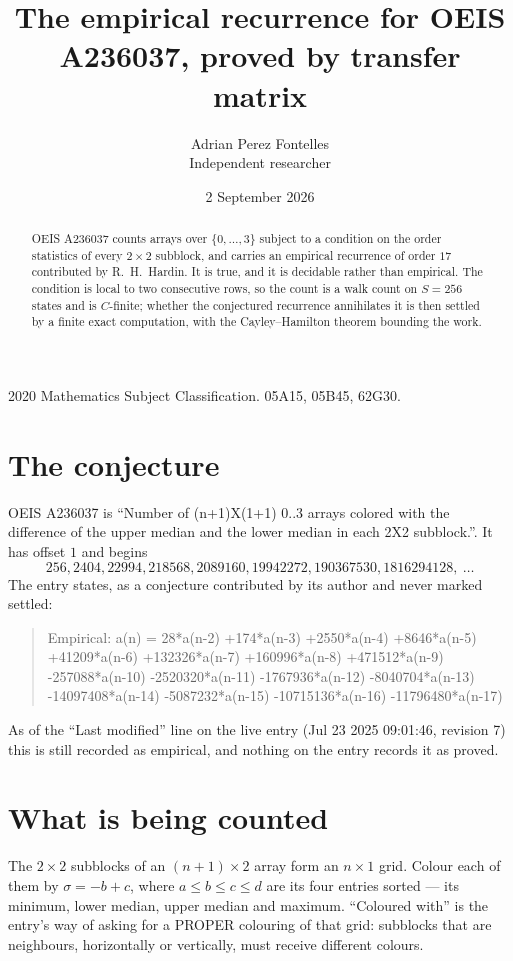 \documentclass[11pt,a4paper]{article}
\title{The empirical recurrence for OEIS A236037, proved by transfer matrix}
\author{Adrian Perez Fontelles\\ \small Independent researcher}
\date{2 September 2026}
\theoremstyle{plain}
\theoremstyle{definition}
\begin{document}
\maketitle

\begin{abstract}
OEIS A236037 counts arrays over $\{0,\dots,3\}$ subject to a condition on the order
statistics of every $2\times2$ subblock, and carries an empirical recurrence of order
$17$ contributed by R.~H.~Hardin. It is true, and it is decidable rather than empirical.
The condition is local to two consecutive rows, so the count is a walk count on $S=256$
states and is $C$-finite; whether the conjectured recurrence annihilates it is then settled by
a finite exact computation, with the Cayley--Hamilton theorem bounding the work.
\end{abstract}

\noindent\small 2020 Mathematics Subject Classification. 05A15, 05B45, 62G30.\normalsize

\section{The conjecture}

OEIS A236037 is ``Number of (n+1)X(1+1) 0..3 arrays colored with the difference of the upper median and the lower median in each 2X2 subblock.''. It has offset $1$ and begins
\[
256, 2404, 22994, 218568, 2089160, 19942272, 190367530, 1816294128,\ \dots
\]
The entry states, as a conjecture contributed by its author and never marked settled:
\begin{quote}
Empirical: a(n) = 28*a(n-2) +174*a(n-3) +2550*a(n-4) +8646*a(n-5) +41209*a(n-6) +132326*a(n-7) +160996*a(n-8) +471512*a(n-9) -257088*a(n-10) -2520320*a(n-11) -1767936*a(n-12) -8040704*a(n-13) -14097408*a(n-14) -5087232*a(n-15) -10715136*a(n-16) -11796480*a(n-17)
\end{quote}
As of the ``Last modified'' line on the live entry (Jul 23 2025 09:01:46, revision 7) this is still
recorded as empirical, and nothing on the entry records it as proved.

\section{What is being counted}

The $2\times2$ subblocks of an $(n+1)\times2$ array form an
$n\times1$ grid. Colour each of them by $\sigma=-b+c$, where $a\le b\le c\le d$ are its four entries sorted --- its minimum, lower median, upper median and maximum. ``Coloured with'' is the entry's way of
asking for a PROPER colouring of that grid: subblocks that are neighbours, horizontally or
vertically, must receive different colours.
\end{document}
